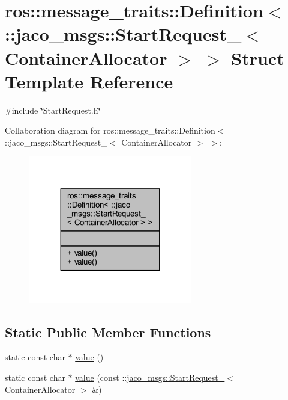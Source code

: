 \hypertarget{structros_1_1message__traits_1_1Definition_3_01_1_1jaco__msgs_1_1StartRequest___3_01ContainerAllocator_01_4_01_4}{}\section{ros\+:\+:message\+\_\+traits\+:\+:Definition$<$ \+:\+:jaco\+\_\+msgs\+:\+:Start\+Request\+\_\+$<$ Container\+Allocator $>$ $>$ Struct Template Reference}
\label{structros_1_1message__traits_1_1Definition_3_01_1_1jaco__msgs_1_1StartRequest___3_01ContainerAllocator_01_4_01_4}


{\ttfamily \#include \char`\"{}Start\+Request.\+h\char`\"{}}



Collaboration diagram for ros\+:\+:message\+\_\+traits\+:\+:Definition$<$ \+:\+:jaco\+\_\+msgs\+:\+:Start\+Request\+\_\+$<$ Container\+Allocator $>$ $>$\+:
\nopagebreak
\begin{figure}[H]
\begin{center}
\leavevmode
\includegraphics[width=203pt]{d5/d50/structros_1_1message__traits_1_1Definition_3_01_1_1jaco__msgs_1_1StartRequest___3_01ContainerAllocator_01_4_01_4__coll__graph}
\end{center}
\end{figure}
\subsection*{Static Public Member Functions}
\begin{DoxyCompactItemize}
\item 
static const char $\ast$ \hyperlink{structros_1_1message__traits_1_1Definition_3_01_1_1jaco__msgs_1_1StartRequest___3_01ContainerAllocator_01_4_01_4_a592d8f4dc0f2cc66e1e3aa044e605689}{value} ()
\item 
static const char $\ast$ \hyperlink{structros_1_1message__traits_1_1Definition_3_01_1_1jaco__msgs_1_1StartRequest___3_01ContainerAllocator_01_4_01_4_a36a4ed651d40e4c0c9d7da96b10606c6}{value} (const \+::\hyperlink{structjaco__msgs_1_1StartRequest__}{jaco\+\_\+msgs\+::\+Start\+Request\+\_\+}$<$ Container\+Allocator $>$ \&)
\end{DoxyCompactItemize}


